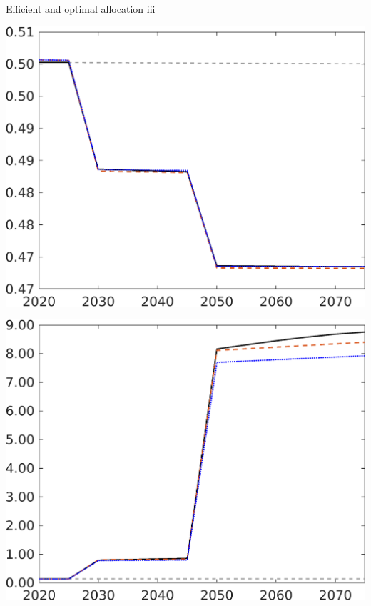 \documentclass[11pt,aspectratio=169]{beamer}
\begin{document}
\begin{frame}{Efficient and optimal allocation iii}
\begin{minipage}[]{0.3\textwidth}
	\end{minipage}
	\begin{minipage}[]{0.3\textwidth}
		\includegraphics[width=1\textwidth]{../codding_model/own_basedOnFried/optimalPol_elastS_DisuSci/figures/all_1705/EY_CompEffOPT_T_NoTaus_spillover0_noskill0_sep1_BN0_ineq0_red0_xgrowth0_zero0_countec0_etaa0.79_lgd0_lff1.png}
	\end{minipage}
	\begin{minipage}[]{0.3\textwidth}
		\includegraphics[width=1\textwidth]{../codding_model/own_basedOnFried/optimalPol_elastS_DisuSci/figures/all_1705/GFF_CompEffOPT_T_NoTaus_spillover0_noskill0_sep1_BN0_ineq0_red0_xgrowth0_zero0_countec0_etaa0.79_lgd0_lff1.png}

\end{minipage}
\end{frame}
\end{document}
